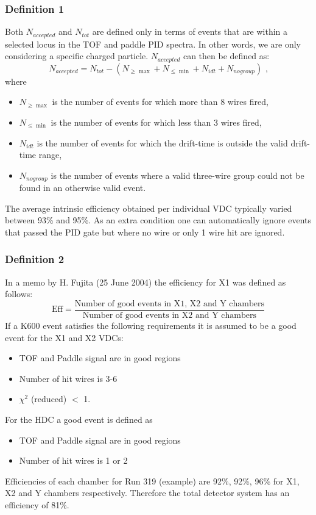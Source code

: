 \documentclass[11pt]{report}
\begin{document}
\subsubsection{Definition 1}
Both $N_{accepted}$ and $N_{tot}$ are defined only in terms of events that are
within a selected locus in the TOF and paddle PID spectra. In other words, we are
only considering a specific charged particle.
$N_{accepted}$ can then be defined as:
\begin{equation} 
N_{accepted}=N_{tot}-(N_{\geq \max }+N_{\leq \min
  }+N_{idt}+N_{nogroup})\textrm{ ,} 
\end{equation} 
where  
\begin{itemize}
\item $N_{\geq \max }$ is the number of events for which more than 8 wires fired,
\item $N_{\leq \min }$ is the number of events for which less than 3 wires fired,  
\item $N_{idt}$ is the number of events for which the drift-time is outside the valid
drift-time range,  
\item $N_{nogroup}$ is the number of events where a valid three-wire group could 
not be found in an otherwise valid event.
\end{itemize}
The average intrinsic efficiency obtained per individual VDC typically varied between 93\% and 95\%.
%
As an extra condition
one can automatically ignore events that passed the PID gate
but where no wire or only 1 wire hit are ignored.

\subsubsection{Definition 2}
In a memo by H. Fujita (25 June 2004) the efficiency for X1 was defined as follows:
\begin{equation}                
\textrm{Eff} = \frac{ \textrm{Number of good events in X1, X2 and Y chambers}}{\textrm{Number of good events in X2 and Y chambers}}                           
\end{equation} 
If a K600 event satisfies the following requirements it is assumed to be a good event
for the X1 and X2 VDCs:
\begin{itemize}
\item  TOF and Paddle signal are in good regions
\item  Number of hit wires is 3-6
\item  $\chi^2$ (reduced) $<$ 1.
\end{itemize}
For the HDC a good event is defined as
\begin{itemize}
\item TOF and Paddle signal are in good regions
\item Number of hit wires is 1 or 2
\end{itemize}
Efficiencies of each chamber for Run 319 
(example) are 92\%, 92\%, 96\% for X1, X2 and Y chambers respectively.
Therefore the total detector system has an efficiency of 81\%.
\end{document}

